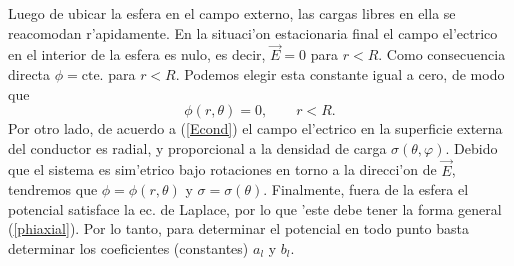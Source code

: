 Luego de ubicar la esfera en el campo externo, las cargas libres en ella se reacomodan r'apidamente. En la situaci'on estacionaria final el campo el'ectrico en el interior de la esfera es nulo, es decir, $\vec{E}=0$ para $r<R$. Como consecuencia directa $\phi=\text{cte.}$ para $r<R$. Podemos elegir esta constante igual a cero, de modo que
\begin{equation}
\phi(r,\theta)=0, \qquad r<R.
\end{equation}
Por otro lado, de acuerdo a (\ref{Econd}) el campo el'ectrico en la superficie externa del conductor es radial, y proporcional a la densidad de carga $\sigma(\theta,\varphi)$. Debido que el sistema es sim'etrico bajo rotaciones en torno a la direcci'on de $\vec{E}$, tendremos que $\phi=\phi(r,\theta)$ y $\sigma=\sigma(\theta)$. Finalmente, fuera de la esfera el potencial satisface la ec. de Laplace, por lo que 'este debe tener la forma general (\ref{phiaxial}). Por lo tanto, para determinar el potencial en todo punto basta determinar los coeficientes (constantes) $a_l$ y $b_l$.

